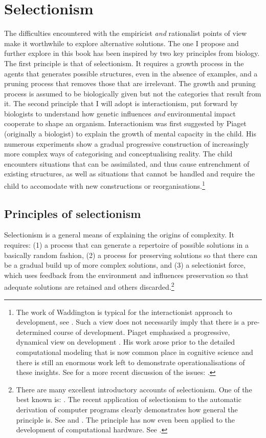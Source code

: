 \section{Selectionism}

The difficulties encountered with the empiricist
{\itshape and} rationalist points of view make it worthwhile
to explore alternative solutions. The one I propose
and further explore in this book 
has been inspired by two key principles 
from biology. The first principle is
that of selectionism. It requires 
a growth process in the agents that generates possible 
structures, even in the absence of examples, and a pruning
process that removes those
that are irrelevant. The growth and pruning
process is assumed to be biologically given
but not the categories that result from it.  
The second principle that 
I will adopt is interactionism, put forward by biologists 
to understand how genetic influences {\itshape and} environmental 
impact cooperate to shape an organism. Interactionism 
was first suggested by Piaget (originally a biologist)
to explain the growth of mental capacity in the child. 
His numerous experiments show a gradual progressive construction of 
increasingly more complex ways of categorising and 
conceptualising reality. The child encounters situations that 
can be assimilated, and thus cause entrenchment of
existing structures, as well 
as situations that cannot be handled and require 
the child to accomodate with new 
constructions or reorganisations.\footnote{
The work of Waddington is typical for the 
interactionist approach to development, see \cite{Waddington:1975}. 
Such a view does not necessarily imply that there is 
a pre-determined course of development.
Piaget emphasised a progressive, dynamical view on 
development \cite{Piaget:1985}. 
His work arose prior to the detailed
computational modeling that is now common place in 
cognitive science and there is still an enormous 
work left to demonstrate operationalisations of these
insights. See for a more recent discussion of 
the issues: \cite{Thelen:1994}.}

\subsection{Principles of selectionism}

Selectionism is a general means of explaining the origins of 
complexity. It requires: (1) a process that 
can generate a repertoire of possible solutions in a 
basically random fashion, (2) a process for preserving 
solutions so that there can be a gradual build up of 
more complex solutions, and (3) a 
selectionist force, which uses
feedback from the environment and influences preservation
so that adequate solutions are retained 
and others discarded.\footnote{
There are many excellent introductory 
accounts of selectionism. One of the best
known is: \cite{Dawkins:1995}. The 
recent application of selectionism to the automatic
derivation of computer programs clearly demonstrates
how general the principle is. See \cite{Goldberg:1989} and \cite{Koza:1997}. 
The principle has now even been applied to 
the development of computational hardware. See \cite{Sipper:1998}.}

